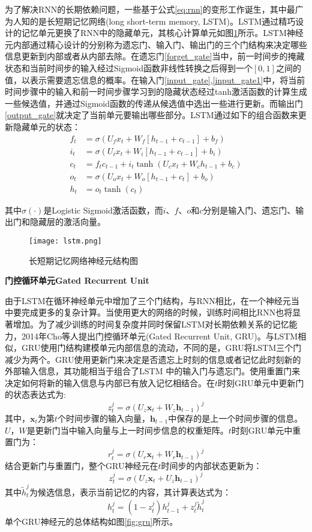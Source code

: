 为了解决RNN的长期依赖问题，一些基于公式\ref{eq:rnn}的变形工作诞生，其中最广为人知的是长短期记忆网络(long short-term memory, LSTM)。LSTM通过精巧设计的记忆单元更换了RNN中的隐藏单元，其核心计算单元如图\ref{fig:lstm}所示。LSTM神经元内部通过精心设计的分别称为遗忘门、输⼊门、输出门的三个门结构来决定哪些信息更新到内部或者从内部去除。在遗忘门\eqref{forget_gate}当中，前一时间步的掩藏状态和当前时间步的输入经过Sigmoid函数非线性转换之后得到一个$[0,1]$之间的值，以表示需要遗忘信息的概率。在输入门\eqref{input_gate},\eqref{input_gate1}中，将当前时间步骤中的输入和前一时间步骤学习到的隐藏状态经过tanh激活函数的计算生成一些候选值，并通过Sigmoid函数的传递从候选值中选出一些进行更新。而输出门\eqref{output_gate}就决定了当前单元要输出哪些部分。LSTM通过如下的组合函数来更新隐藏单元的状态：
  \begin{align} 
  f_{t} &=\sigma(U_{f} x_{t}+W_{f}[h_{t-1}+ c_{t-1}] +b_{f}) \label{forget_gate}\\
  i_{t} &=\sigma(U_{i} x_{t}+W_{i}[h_{t-1}+ c_{t-1}]+b_{i}) \label{input_gate}\\  
  c_{t} &=f_{t} c_{t-1}+i_{t} \tanh (U_{c} x_{t}+W_{c} h_{t-1}+b_{c}) \label{input_gate1}\\ 
  o_{t} &=\sigma(U_{o} x_{t}+W_{o}[h_{t-1}+ c_{t}]+b_{o}) \label{output_gate}\\ 
  h_{t} &=o_{t} \tanh (c_{t}) 
  \end{align}

其中$\sigma(\cdot)$是Logistic Sigmoid激活函数，而$i$、$f$、$o$和$c$分别是输入门、遗忘门、输出门和隐藏层的激活向量。

\begin{figure}[htb]
  \centering
  \texttt{[image: lstm.png]}\\
  \caption{长短期记忆网络神经元结构图}
  \label{fig:lstm}
\end{figure}

\textbf{门控循环单元Gated Recurrent Unit}

由于LSTM在循环神经单元中增加了三个门结构，与RNN相比，在一个神经元当中要完成更多的复杂计算。当使用更大的网络的时候，训练时间相比RNN也将显著增加。为了减少训练的时间复杂度并同时保留LSTM对长期依赖关系的记忆能力，2014年Cho等人提出门控循环单元(Gated Recurrent Unit, GRU)。与LSTM相似，GRU使用门结构建模单元内部信息的流动，不同的是，GRU将LSTM三个门减少为两个。GRU使用更新门来决定是否遗忘上时刻的信息或者记忆此时刻新的外部输入信息，其功能相当于组合了LSTM 中的输入门与遗忘门。使用重置门来决定如何将新的输入信息与内部已有放入记忆相结合。在$t$时刻GRU单元中更新门的状态表达式为:
$$
z_{t}^{j}=\sigma\left(U_{z} \mathbf{x}_{t}+W_{z} \mathbf{h}_{t-1}\right)^{j}
$$
其中，$\mathbf{x}_{t}$为第$t$个时间步骤的输入向量，$\mathbf{h}_{t-1}$中保存的是上一个时间步骤的信息。$U$，$W$是更新门当中输入向量与上一时间步信息的权重矩阵。$t$时刻GRU单元中重置门为：
$$
r_{t}^{j}=\sigma\left(U_{r} \mathbf{x}_{t}+W_{r} \mathbf{h}_{t-1}\right)^{j}
$$
结合更新门与重置门，整个GRU神经元在$t$时间步的内部状态更新为：
$$
z_{t}^{j}=\sigma\left(U_{z} \mathbf{x}_{t}+U_{z} \mathbf{h}_{t-1}\right)^{j}
$$
其中$\tilde{h}_{t}^{j}$为候选信息，表示当前记忆的内容，其计算表达式为：
$$
h_{t}^{j}=\left(1-z_{t}^{j}\right) h_{t-1}^{j}+z_{t}^{j} \tilde{h}_{t}^{j}
$$
单个GRU神经元的总体结构如图\ref{fig:gru}所示。

